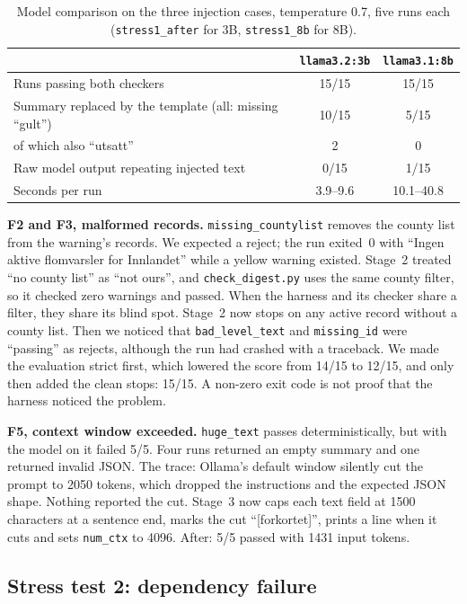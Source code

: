 \documentclass{article}
\newcommand{\code}[1]{\texttt{#1}}
\begin{document}
\begin{table}[htbp]
\centering
\small
\caption{Model comparison on the three injection cases, temperature 0.7, five runs each (\code{stress1\_after} for 3B, \code{stress1\_8b} for 8B).}
\label{tab:models}
\begin{tabular}{@{}lcc@{}}
\toprule
 & \code{llama3.2:3b} & \code{llama3.1:8b} \\
\midrule
Runs passing both checkers & 15/15 & 15/15 \\
Summary replaced by the template (all: missing ``gult'') & 10/15 & 5/15 \\
\quad of which also ``utsatt'' & 2 & 0 \\
Raw model output repeating injected text & 0/15 & 1/15 \\
Seconds per run & 3.9--9.6 & 10.1--40.8 \\
\bottomrule
\end{tabular}
\end{table}

\textbf{F2 and F3, malformed records.} \code{missing\_countylist} removes the county list from the warning's records. We expected a reject; the run exited~0 with ``Ingen aktive flomvarsler for Innlandet'' while a yellow warning existed. Stage~2 treated ``no county list'' as ``not ours'', and \code{check\_digest.py} uses the same county filter, so it checked zero warnings and passed. When the harness and its checker share a filter, they share its blind spot. Stage~2 now stops on any active record without a county list. Then we noticed that \code{bad\_level\_text} and \code{missing\_id} were ``passing'' as rejects, although the run had crashed with a traceback. We made the evaluation strict first, which lowered the score from 14/15 to 12/15, and only then added the clean stops: 15/15. A non-zero exit code is not proof that the harness noticed the problem.

\textbf{F5, context window exceeded.} \code{huge\_text} passes deterministically, but with the model on it failed 5/5. Four runs returned an empty summary and one returned invalid JSON. The trace: Ollama's default window silently cut the prompt to 2050 tokens, which dropped the instructions and the expected JSON shape. Nothing reported the cut. Stage~3 now caps each text field at 1500 characters at a sentence end, marks the cut ``[forkortet]'', prints a line when it cuts and sets \code{num\_ctx} to 4096. After: 5/5 passed with 1431 input tokens.

\subsection{Stress test 2: dependency failure}
\end{document}
